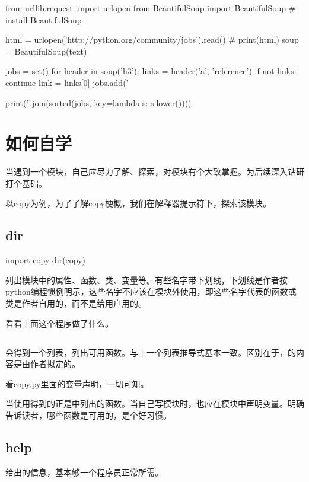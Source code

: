 \begin{python}
from urllib.request import urlopen
from BeautifulSoup import BeautifulSoup  # install BeautifulSoup

html = urlopen('http://python.org/community/jobs').read()
# print(html)
soup = BeautifulSoup(text)

jobs = set()
for header in soup('h3'):
    links = header('a', 'reference')
    if not links: 
        continue
    link = links[0]
    jobs.add('%

print('\n'.join(sorted(jobs, key=lambda s: s.lower())))
\end{python}

\section{如何自学}
当遇到一个模块，自己应尽力了解、探索，对模块有个大致掌握。为后续深入钻研打个基础。

以copy为例，为了了解copy梗概，我们在解释器提示符下，探索该模块。
\subsection{dir}

\begin{python}
import copy
dir(copy)  
\end{python}
列出模块中的属性、函数、类、变量等。有些名字带下划线，下划线是作者按python编程惯例明示，这些名字不应该在模块外使用，即这些名字代表的函数或类是作者自用的，而不是给用户用的。
\begin{python}
\end{python}
看看上面这个程序做了什么。
\subsection{}
会得到一个列表，列出可用函数。与上一个列表推导式基本一致。区别在于，的内容是由作者拟定的。

看copy.py里面的变量声明，一切可知。

当使用得到的正是中列出的函数。当自己写模块时，也应在模块中声明变量。明确告诉读者，哪些函数是可用的，是个好习惯。
\subsection{help}
给出的信息，基本够一个程序员正常所需。
